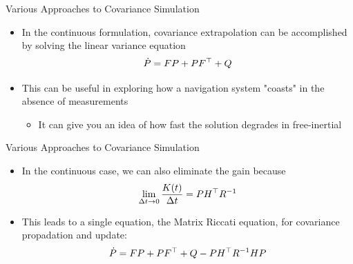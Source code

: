 

\begin{frame}
Various Approaches to Covariance Simulation
\begin{itemize}
  \item In the continuous formulation, covariance extrapolation can be accomplished by solving the linear variance equation 
\begin{equation}\label{lvteqcont}
\dot{P}=FP+PF^\top+Q
\end{equation} 
  \item This can be useful in exploring how a navigation system "coasts" in the absence of measurements
	\begin{itemize}
  		\item It can give you an idea of how fast the solution degrades in free-inertial
	\end{itemize}
\end{itemize} 
\end{frame}


\begin{frame}
Various Approaches to Covariance Simulation
\begin{itemize}
  \item In the continuous case, we can also eliminate the gain because
\[\lim_{\Delta t\rightarrow 0}\dfrac{K(t)}{\Delta t}=PH^\top R^{-1}\]
  \item This leads to a single equation, the Matrix Riccati equation, for covariance propadation and update:
\begin{equation}\label{matrixriccatieq}
\dot{P}=FP+PF^\top+Q - PH^\top R^{-1}HP
\end{equation} 
\end{itemize} 
\end{frame}

